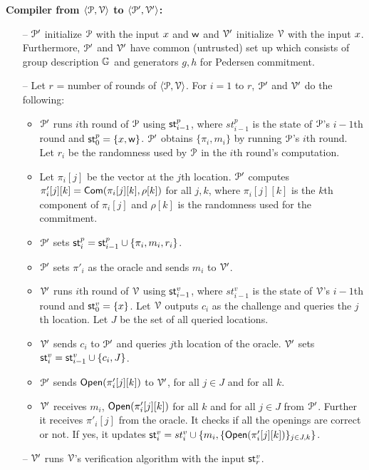\textbf{Compiler from $\langle \mathcal{P},\mathcal{V}\rangle$ to $\langle \mathcal{P}',\mathcal{V}'\rangle$:}
\begin{itemize}
	\item[--] $\mathcal{P}'$ initialize $\mathcal{P}$ with the input ${x}$ and $\mathsf{w}$ and $\mathcal{V}'$ initialize $\mathcal{V}$ with the input ${x}$. Furthermore, $\mathcal{P}'$ and $\mathcal{V}'$ have common (untrusted) set up which consists of group description $\mathbb{G}$ and generators $g, h$ for Pedersen commitment.
	\item[--] Let $r$ = number of rounds of $\langle \mathcal{P},\mathcal{V}\rangle$.
	For $i = 1$ to $r$, $\mathcal{P}'$ and $\mathcal{V}'$ do the following: 
	\begin{itemize}
		\item $\mathcal{P}'$ runs $i$th round of $\mathcal{P}$ using $\mathsf{st}^p_{i-1}$, where $st^p_{i-1}$ is the state of $\mathcal{P}$'s $i-1$th round and $\mathsf{st}^p_0 = \{{x}, \mathsf{w}\}$. $\mathcal{P}'$ obtains $\{\pi_i, m_i\}$ by running $\mathcal{P}$'s $i$th round. Let $r_i$ be the randomness used by $\mathcal{P}$ in the $i$th round's computation.
		\item Let $\pi_i[j]$ be the vector at the $j$th location. $\mathcal{P}'$ computes $\pi'_i[j][k] = \mathsf{Com}(\pi_i[j][k], \rho[k])$ for all $j,k$, where $\pi_i[j][k]$ is the $k$th component of $\pi_i[j]$ and $\rho[k]$ is the randomness used for the commitment.
		\item $\mathcal{P}'$ sets $\mathsf{st}^p_i = \mathsf{st}^p_{i-1} \cup \{\pi_i, m_i, r_i\}$. 
		\item $\mathcal{P}'$ sets $\pi'_i$ as the oracle and sends $m_i$ to $\mathcal{V}'$.
		\item $\mathcal{V}'$ runs $i$th round of $\mathcal{V}$ using $\mathsf{st}^v_{i-1}$, where $st^v_{i-1}$ is the state of $\mathcal{V}$'s $i-1$th round and $\mathsf{st}^v_0 = \{{x}\}$. Let $\mathcal{V}$ outputs $c_i$ as the challenge and queries the $j$th location. Let $J$ be the set of all queried locations.
		\item $\mathcal{V}'$ sends $c_i$ to $\mathcal{P}'$ and queries $j$th location of the oracle. $\mathcal{V}'$ sets $\mathsf{st}^v_{i} = \mathsf{st}^v_{i-1} \cup \{c_i, J\}$.
		\item $\mathcal{P}'$ sends $\mathsf{Open}(\pi'_i[j][k])$ to $\mathcal{V}'$, for all $j\in J$ and for all $k$.
		\item $\mathcal{V}'$ receives $m_i$, $\mathsf{Open}(\pi'_i[j][k])$ for all $k$ and for all $j\in J$ from $\mathcal{P}'$. Further it receives $\pi'_i[j]$ from the oracle. It checks if all the openings are correct or not. If yes, it updates $\mathsf{st}^v_{i} = st^v_{i} \cup \{m_i, \{\mathsf{Open}(\pi'_i[j][k])\}_{j\in J, k}\}$.
	\end{itemize} 
	\item[--] $\mathcal{V}'$ runs $\mathcal{V}$'s verification algorithm with the input $\mathsf{st}^v_r$.
\end{itemize}


